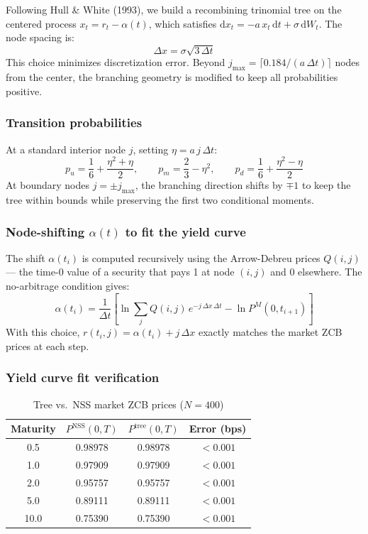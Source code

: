 \documentclass[12pt, a4paper]{article}
\newcommand{\diff}{\mathrm{d}}
\begin{document}
Following Hull \& White (1993), we build a recombining trinomial tree on the centered process $x_t = r_t - \alpha(t)$, which satisfies $\diff x_t = -a\,x_t\,\diff t + \sigma\,\diff W_t$. The node spacing is:
\begin{equation}
\Delta x = \sigma\sqrt{3\,\Delta t}
\end{equation}
This choice minimizes discretization error. Beyond $j_{\max} = \lceil 0.184 / (a\,\Delta t) \rceil$ nodes from the center, the branching geometry is modified to keep all probabilities positive.

\subsubsection{Transition probabilities}

At a standard interior node $j$, setting $\eta = a\,j\,\Delta t$:
\begin{equation}
p_u = \frac{1}{6} + \frac{\eta^2 + \eta}{2}, \qquad p_m = \frac{2}{3} - \eta^2, \qquad p_d = \frac{1}{6} + \frac{\eta^2 - \eta}{2}
\end{equation}
At boundary nodes $j = \pm j_{\max}$, the branching direction shifts by $\mp 1$ to keep the tree within bounds while preserving the first two conditional moments.

\subsubsection{Node-shifting $\alpha(t)$ to fit the yield curve}

The shift $\alpha(t_i)$ is computed recursively using the Arrow-Debreu prices $Q(i,j)$ — the time-0 value of a security that pays 1 at node $(i,j)$ and 0 elsewhere. The no-arbitrage condition gives:
\begin{equation}
\alpha(t_i) = \frac{1}{\Delta t}\left[\ln\!\sum_j Q(i,j)\,e^{-j\,\Delta x\,\Delta t} - \ln P^M(0, t_{i+1})\right]
\end{equation}
With this choice, $r(t_i, j) = \alpha(t_i) + j\,\Delta x$ exactly matches the market ZCB prices at each step.

\subsubsection{Yield curve fit verification}

\begin{table}[H]
\centering
\begin{tabular}{cccc}
\toprule
\textbf{Maturity} & \textbf{$P^{\text{NSS}}(0,T)$} & \textbf{$P^{\text{tree}}(0,T)$} & \textbf{Error (bps)} \\
\midrule
0.5  & 0.98978 & 0.98978 & $<0.001$ \\
1.0  & 0.97909 & 0.97909 & $<0.001$ \\
2.0  & 0.95757 & 0.95757 & $<0.001$ \\
5.0  & 0.89111 & 0.89111 & $<0.001$ \\
10.0 & 0.75390 & 0.75390 & $<0.001$ \\
\bottomrule
\end{tabular}
\caption{Tree vs.\ NSS market ZCB prices ($N = 400$)}
\end{table}
\end{document}
